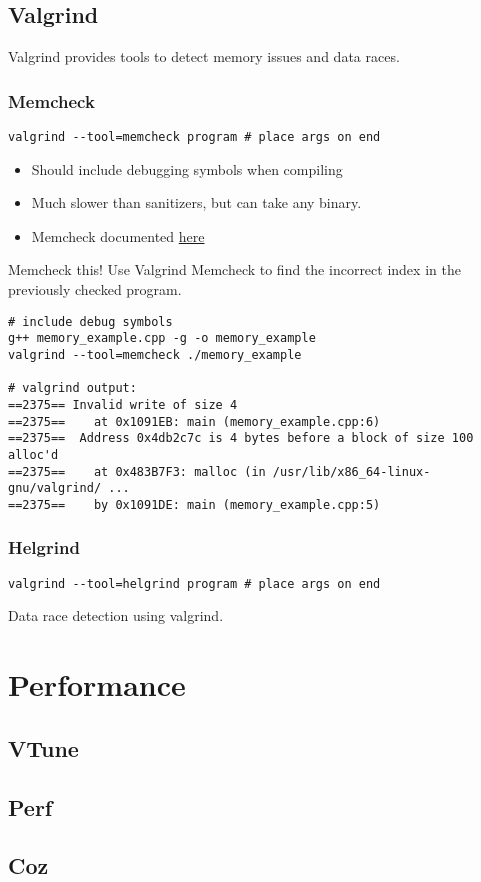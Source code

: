 \subsection{Valgrind}
Valgrind provides tools to detect memory issues and data races.
\subsubsection{Memcheck}
\begin{verbatim}
valgrind --tool=memcheck program # place args on end
\end{verbatim}
\begin{itemize}
    \item Should include debugging symbols when compiling
    \item Much slower than sanitizers, but can take any binary.
    \item Memcheck documented \href{https://valgrind.org/docs/manual/mc-manual.html}{here}
\end{itemize}

\begin{examplebox}{Memcheck this!}
    Use Valgrind Memcheck to find the incorrect index in the previously checked program.
    \tcblower
    \begin{verbatim}
# include debug symbols
g++ memory_example.cpp -g -o memory_example
valgrind --tool=memcheck ./memory_example

# valgrind output:
==2375== Invalid write of size 4
==2375==    at 0x1091EB: main (memory_example.cpp:6)
==2375==  Address 0x4db2c7c is 4 bytes before a block of size 100 alloc'd
==2375==    at 0x483B7F3: malloc (in /usr/lib/x86_64-linux-gnu/valgrind/ ...
==2375==    by 0x1091DE: main (memory_example.cpp:5)
    \end{verbatim}
\end{examplebox}

\subsubsection{Helgrind}
\begin{verbatim}
valgrind --tool=helgrind program # place args on end
\end{verbatim}
Data race detection using valgrind.

\section{Performance}
\subsection{VTune}
\unfinished

\subsection{Perf}
\unfinished

\subsection{Coz}
\unfinished
